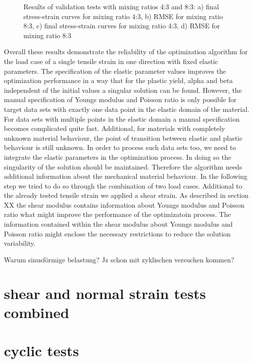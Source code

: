     \begin{figure}[H]
        \centering
        \caption{Results of validation tests with mixing ratios 4:3 and 8:3: a) final stress-strain curves for mixing ratio 4:3, b) RMSE for mixing ratio 8:3, c) final stress-strain curves for mixing ratio 4:3, d) RMSE for mixing ratio 8:3}
        \label{fig:validation results}
    \end{figure}

    Overall these results demonstrate the reliability of the optimization algorithm for the load case of a single tensile strain in one direction with fixed elastic parameters. The specification of the elastic parameter values improves the optimization performance in a way that for the plastic yield, alpha and beta independent of the initial values a singular solution can be found. However, the manual specification of Youngs modulus and Poisson ratio is only possible for target data sets with exactly one data point in the elastic domain of the material. For data sets with multiple points in the elastic domain a manual specification becomes complicated quite fast. Additional, for materials with completely unknown material behaviour, the point of transition between elastic and plastic behaviour is still unknown. In order to process such data sets too, we need to integrate the elastic parameters in the optimization process. In doing so the singularity of the solution should be maintained. Therefore the algorithm needs additional information about the mechanical material behaviour. In the following step we tried to do so through the combination of two load cases. Additional to the already tested tensile strain we applied a shear strain. As described in section XX the shear modulus contains information about Youngs modulus and  Poisson ratio what might improve the performance of the optimizatoin process. The information contained within the shear modulus about Youngs modulus and Poisson ratio might enclose the necessary restrictions to reduce the solution variability. 
    
    Warum sinusförmige belastung? Jz schon mit zyklischen versuchen kommen?
    

    \section{shear and normal strain tests combined}
    \section{cyclic tests}







	